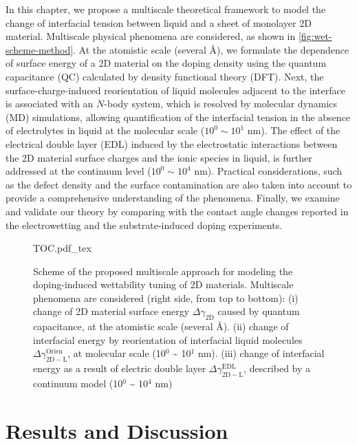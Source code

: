In this chapter, we propose a multiscale theoretical framework to model
the change of interfacial tension between liquid and a sheet of
monolayer 2D material.
%
Multiscale physical phenomena are considered,
as shown in \autoref{fig:wet-scheme-method}. At the atomistic scale
(several \AA{}), we formulate the dependence of surface energy of a 2D
material on the doping density using the quantum capacitance (QC)
calculated by density functional theory (DFT). Next, the
surface-charge-induced reorientation of liquid molecules adjacent to
the interface is associated with an $N$-body system, which is resolved
by molecular dynamics (MD) simulations, allowing quantification of the
interfacial tension in the absence of electrolytes in liquid at the
molecular scale (\(10^{0} \sim 10^{1}\) nm).
%
The effect of the electrical
double layer (EDL) induced by the electrostatic interactions between
the 2D material surface charges and the ionic species in liquid, is
further addressed at the continuum level (\(10^{0} \sim 10^{4}\) nm).
%
Practical
considerations, such as the defect density and the surface
contamination are also taken into account to provide a comprehensive
understanding of the phenomena. Finally, we examine and validate our
theory by comparing with the contact angle changes reported in the
electrowetting and the substrate-induced doping experiments.

\begin{figure}[htbp]
  \centering
  {TOC.pdf_tex}
\caption{\label{fig:wet-scheme-method} Scheme of the proposed multiscale
  approach for modeling the doping-induced wettability tuning of 2D
  materials. Multiscale phenomena are considered (right side, from top
  to bottom): (i) change of 2D material surface energy
  \(\Delta \gamma_{\mathrm{2D}}\) caused by quantum capacitance, at
  the atomistic scale (several \AA{}). (ii) change of interfacial
  energy by reorientation of interfacial liquid molecules
  \(\Delta \gamma_{\mathrm{2D-L}} ^{\mathrm{Orien}}\), at molecular
  scale (10\(^{\text{0}}\) \textasciitilde{} 10\(^{\text{1}}\)
  nm). (iii) change of interfacial energy as a result of electric
  double layer \(\Delta \gamma_{\mathrm{2D-L}} ^{\mathrm{EDL}}\),
  described by a continuum model (10\(^{\text{0}}\) \textasciitilde{}
  10\(^{\text{4}}\) nm)}
\end{figure}

\section{Results and Discussion}
\label{sec:wet-results}

